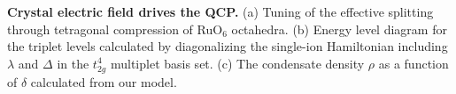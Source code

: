 \label{fig:fig1} {\bf Crystal electric field drives the QCP.} (a) Tuning of the effective splitting \leff through tetragonal compression of RuO$_6$ octahedra. (b) Energy level diagram for the triplet levels calculated by diagonalizing the single-ion Hamiltonian including $\lambda$ and $\Delta$ in the $t_{2g}^4$ multiplet basis set. (c) The condensate density $\rho$ as a function of $\delta$ calculated from our model.  